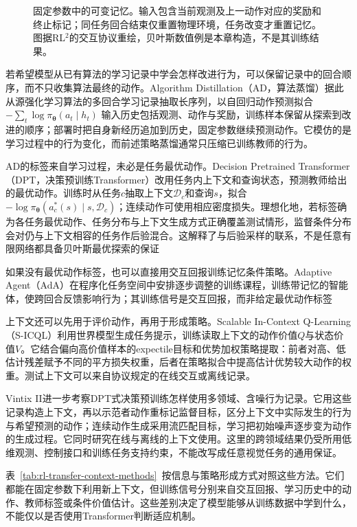 \begin{figure}[htbp]
 \centering
 
 \caption{固定参数中的可变记忆。输入包含当前观测及上一动作对应的奖励和终止标记；同任务回合结束仅重置物理环境，任务改变才重置记忆。图据RL$^2$的交互协议重绘，贝叶斯数值例是本章构造，不是其训练结果。}
 \label{fig:rl-transfer-rl2-memory}
\end{figure}

若希望模型从已有算法的学习记录中学会怎样改进行为，可以保留记录中的回合顺序，而不只收集算法最终的动作。Algorithm Distillation（AD，算法蒸馏）据此从源强化学习算法的多回合学习记录抽取长序列，以自回归动作预测拟合
$-\sum_t\log\pi_{\bm\theta}(a_t\mid h_t)$
输入历史包括观测、动作与奖励，训练样本保留从探索到改进的顺序；部署时把自身新经历追加到历史，固定参数继续预测动作。它模仿的是学习过程中的行为变化，而前述策略蒸馏通常只压缩已训练教师的行为。

AD的标签来自学习过程，未必是任务最优动作。Decision Pretrained Transformer（DPT，决策预训练Transformer）改用任务内上下文和查询状态，预测教师给出的最优动作。训练时从任务$c$抽取上下文$\mathcal D_c$和查询$s$，拟合
$-\log\pi_{\bm\theta}(a_c^*(s)\mid s,\mathcal D_c)$；连续动作可使用相应密度损失。理想化地，若标签确为各任务最优动作、任务分布与上下文生成方式正确覆盖测试情形，监督条件分布会对仍与上下文相容的任务作后验混合。这解释了与后验采样的联系，不是任意有限网络都具备贝叶斯最优探索的保证

如果没有最优动作标签，也可以直接用交互回报训练记忆条件策略。Adaptive Agent（AdA）在程序化任务空间中安排逐步调整的训练课程，训练带记忆的智能体，使跨回合反馈影响行为；其训练信号是交互回报，而非给定最优动作标签

上下文还可以先用于评价动作，再用于形成策略。Scalable In-Context Q-Learning（S-ICQL）利用世界模型生成任务提示，训练读取上下文的动作价值$Q$与状态价值$V$。它结合偏向高价值样本的expectile目标和优势加权策略提取：前者对高、低估计残差赋予不同的平方损失权重，后者在策略拟合中提高估计优势较大动作的权重。测试上下文可以来自协议规定的在线交互或离线记录。

Vintix II进一步考察DPT式决策预训练怎样使用多领域、含噪行为记录。它用这些记录构造上下文，再以示范者动作重标记监督目标，区分上下文中实际发生的行为与希望预测的动作；连续动作生成采用流匹配目标，学习把初始噪声逐步变为动作的生成过程。它同时研究在线与离线的上下文使用。这里的跨领域结果仍受所用低维观测、控制接口和训练任务支持约束，不能改写成任意视觉任务的通用保证。

表~\ref{tab:rl-transfer-context-methods}~按信息与策略形成方式对照这些方法。它们都能在固定参数下利用新上下文，但训练信号分别来自交互回报、学习历史中的动作、教师标签或条件价值估计。这些差别决定了模型能够从训练数据中学到什么，不能仅以是否使用Transformer判断适应机制。

